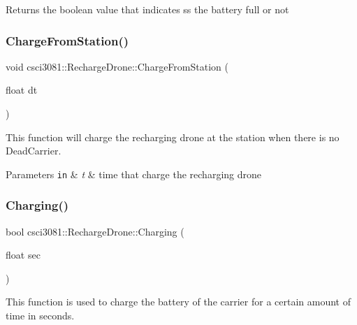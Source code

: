 \begin{DoxyReturn}{Returns}
the boolean value that indicates ss the battery full or not 
\end{DoxyReturn}
\mbox{\label{classcsci3081_1_1RechargeDrone_aae4cc9921818edce62664130e29cc205}} 
\subsubsection{\texorpdfstring{Charge\+From\+Station()}{ChargeFromStation()}}
{\footnotesize\ttfamily void csci3081\+::\+Recharge\+Drone\+::\+Charge\+From\+Station (\begin{DoxyParamCaption}\item[{float}]{dt }\end{DoxyParamCaption})}



This function will charge the recharging drone at the station when there is no Dead\+Carrier. 


\begin{DoxyParams}[1]{Parameters}
\mbox{\tt in}  & {\em t} & time that charge the recharging drone \\
\hline
\end{DoxyParams}
\mbox{\label{classcsci3081_1_1RechargeDrone_a54f93680add2c289a2b354e1331ad81f}} 
\subsubsection{\texorpdfstring{Charging()}{Charging()}}
{\footnotesize\ttfamily bool csci3081\+::\+Recharge\+Drone\+::\+Charging (\begin{DoxyParamCaption}\item[{float}]{sec }\end{DoxyParamCaption})}



This function is used to charge the battery of the carrier for a certain amount of time in seconds. 



